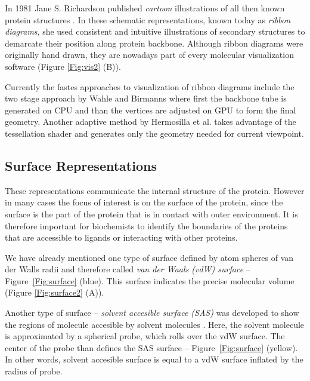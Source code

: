 In 1981 Jane S. Richardson published \textit{cartoon} illustrations of all then known protein structures \cite{richardson1981anatomy}. In these schematic representations, known today as \textit{ribbon diagrams}, she used consistent and intuitive illustrations of secondary structures to demarcate their position along protein backbone. Although ribbon diagrams were originally hand drawn, they are nowadays part of every molecular visualization software (Figure \ref{Fig:vis2} (B)).

Currently the fastes approaches to visualization of ribbon diagrams include the two stage approach by Wahle and Birmanns \cite{wahle2011gpu} where first the backbone tube is generated on CPU and than the vertices are adjusted on GPU to form the final geometry. Another adaptive method by Hermosilla et al. \cite{hermosilla2015instant} takes advantage of the tessellation shader and generates only the geometry needed for current viewpoint.

\subsection{Surface Representations}
\label{Sec:surfaces}
These representations communicate the internal structure of the protein. However in many cases the focus of interest is on the surface of the protein, since the surface is the part of the protein that is in contact with outer environment. It is therefore important for biochemists to identify the boundaries of the proteins that are accessible to ligands or interacting with other proteins.

We have already mentioned one type of surface defined by atom spheres of van der Walls radii and therefore called \textit{van der Waals (vdW) surface} \cite{richards1977areas} -- Figure~\ref{Fig:surface} (blue). This surface indicates the precise molecular volume (Figure \ref{Fig:surface2} (A)).

Another type of surface -- \textit{solvent accesible surface (SAS)} was developed to show the regions of molecule accesible by solvent molecules \cite{lee1971interpretation}. Here, the solvent molecule is approximated by a spherical probe, which rolls over the vdW surface. The center of the probe than defines the SAS surface -- Figure~\ref{Fig:surface} (yellow). In other words, solvent accesible surface is equal to a vdW surface inflated by the radius of probe.

